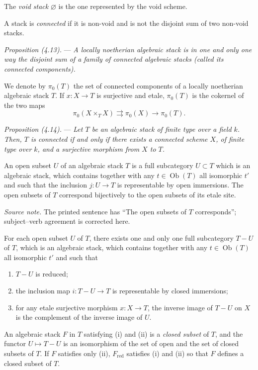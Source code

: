 \documentclass[10pt]{article}
\begin{document}
The \emph{void stack} $\varnothing$ is the one represented by the void scheme.

A stack is \emph{connected} if it is non-void and is not the disjoint sum of two non-void stacks.

\medskip
\noindent\emph{Proposition (4.13).} --- \emph{A locally noetherian algebraic stack is in one and only one way the disjoint sum of a family of connected algebraic stacks (called its connected components).}

We denote by $\pi_0(T)$ the set of connected components of a locally noetherian algebraic stack $T$. If $x:X\to T$ is surjective and etale, $\pi_0(T)$ is the cokernel of the two maps
\[
\pi_0(X\times_T X)\rightrightarrows \pi_0(X)\longrightarrow \pi_0(T).
\]

\medskip
\noindent\emph{Proposition (4.14).} --- \emph{Let $T$ be an algebraic stack of finite type over a field $k$. Then, $T$ is connected if and only if there exists a connected scheme $X$, of finite type over $k$, and a surjective morphism from $X$ to $T$.}

An open subset $U$ of an algebraic stack $T$ is a full subcategory $U\subset T$ which is an algebraic stack, which contains together with any $t\in\operatorname{Ob}(T)$ all isomorphic $t'$ and such that the inclusion $j:U\to T$ is representable by open immersions. The open subsets of $T$ correspond bijectively to the open subsets of its etale site.

\smallskip
\noindent\textit{Source note.} The printed sentence has ``The open subsets of $T$ corresponds''; subject--verb agreement is corrected here.

For each open subset $U$ of $T$, there exists one and only one full subcategory $T-U$ of $T$, which is an algebraic stack, which contains together with any $t\in\operatorname{Ob}(T)$ all isomorphic $t'$ and such that
\begin{enumerate}[label=(\roman*)]
\item $T-U$ is reduced;
\item the inclusion map $i:T-U\to T$ is representable by closed immersions;
\item for any etale surjective morphism $x:X\to T$, the inverse image of $T-U$ on $X$ is the complement of the inverse image of $U$.
\end{enumerate}

An algebraic stack $F$ in $T$ satisfying (i) and (ii) is a \emph{closed subset} of $T$, and the functor $U\mapsto T-U$ is an isomorphism of the set of open and the set of closed subsets of $T$. If $F$ satisfies only (ii), $F_{\mathrm{red}}$ satisfies (i) and (ii) so that $F$ defines a closed subset of $T$.
\end{document}
